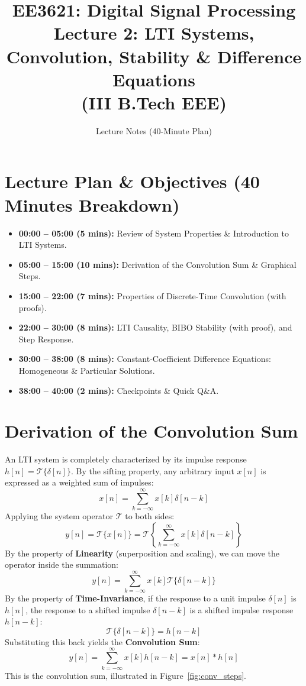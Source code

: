 \documentclass[11pt,a4paper]{article}
\title{\textbf{EE3621: Digital Signal Processing} \\ \Large Lecture 2: LTI Systems, Convolution, Stability \& Difference Equations \\ \large (III B.Tech EEE)}
\author{Lecture Notes (40-Minute Plan)}
\date{}
\begin{document}
\maketitle

\section{Lecture Plan \& Objectives (40 Minutes Breakdown)}
\begin{itemize}
    \item \textbf{00:00 -- 05:00 (5 mins):} Review of System Properties \& Introduction to LTI Systems.
    \item \textbf{05:00 -- 15:00 (10 mins):} Derivation of the Convolution Sum \& Graphical Steps.
    \item \textbf{15:00 -- 22:00 (7 mins):} Properties of Discrete-Time Convolution (with proofs).
    \item \textbf{22:00 -- 30:00 (8 mins):} LTI Causality, BIBO Stability (with proof), and Step Response.
    \item \textbf{30:00 -- 38:00 (8 mins):} Constant-Coefficient Difference Equations: Homogeneous \& Particular Solutions.
    \item \textbf{38:00 -- 40:00 (2 mins):} Checkpoints \& Quick Q\&A.
\end{itemize}

\section{Derivation of the Convolution Sum}
An LTI system is completely characterized by its impulse response $h[n] = \mathcal{T}\{\delta[n]\}$.
By the sifting property, any arbitrary input $x[n]$ is expressed as a weighted sum of impulses:
\begin{equation}
x[n] = \sum_{k=-\infty}^{\infty} x[k] \delta[n-k]
\end{equation}
Applying the system operator $\mathcal{T}$ to both sides:
\begin{equation}
y[n] = \mathcal{T}\{x[n]\} = \mathcal{T}\left\{ \sum_{k=-\infty}^{\infty} x[k] \delta[n-k] \right\}
\end{equation}
By the property of \textbf{Linearity} (superposition and scaling), we can move the operator inside the summation:
\begin{equation}
y[n] = \sum_{k=-\infty}^{\infty} x[k] \mathcal{T}\{\delta[n-k]\}
\end{equation}
By the property of \textbf{Time-Invariance}, if the response to a unit impulse $\delta[n]$ is $h[n]$, the response to a shifted impulse $\delta[n-k]$ is a shifted impulse response $h[n-k]$:
\begin{equation}
\mathcal{T}\{\delta[n-k]\} = h[n-k]
\end{equation}
Substituting this back yields the \textbf{Convolution Sum}:
\begin{equation}
y[n] = \sum_{k=-\infty}^{\infty} x[k] h[n-k] = x[n] * h[n]
\end{equation}
This is the convolution sum, illustrated in Figure~\ref{fig:conv_steps}.
\end{document}
